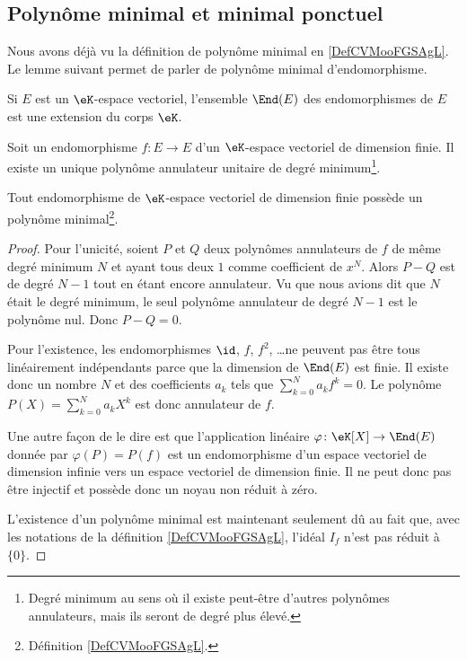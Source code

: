 \subsection{Polynôme minimal et minimal ponctuel}

Nous avons déjà vu la définition de polynôme minimal en \ref{DefCVMooFGSAgL}. Le lemme suivant permet de parler de polynôme minimal d'endomorphisme.

\begin{lemma}       \label{LEMooEYPSooLCoPlY}
	Si \( E\) est un \( \eK\)-espace vectoriel, l'ensemble \( \End(E)\) des endomorphismes de \( E\) est une extension du corps \( \eK\).
\end{lemma}

\begin{lemma}        \label{LEMooQJQGooRcAxmJ}
	Soit un endomorphisme \( f\colon E\to E\) d'un \( \eK\)-espace vectoriel de dimension finie. Il existe un unique polynôme annulateur unitaire de degré minimum\footnote{Degré minimum au sens où il existe peut-être d'autres polynômes annulateurs, mais ils seront de degré plus élevé.}.

	Tout endomorphisme de \( \eK\)-espace vectoriel de dimension finie possède un polynôme minimal\footnote{Définition \ref{DefCVMooFGSAgL}.}.
\end{lemma}

\begin{proof}
	Pour l'unicité, soient \( P\) et \( Q\) deux polynômes annulateurs de \( f\) de même degré minimum \( N\) et ayant tous deux \( 1\) comme coefficient de \( x^N\). Alors \( P-Q\) est de degré \( N-1\) tout en étant encore annulateur. Vu que nous avions dit que \( N\) était le degré minimum, le seul polynôme annulateur de degré \( N-1\) est le polynôme nul. Donc \( P-Q=0\).

	Pour l'existence, les endomorphismes \( \id\), \( f\), \( f^2\), \ldots ne peuvent pas être tous linéairement indépendants parce que la dimension de \( \End(E)\) est finie. Il existe donc un nombre \( N\) et des coefficients \( a_k\) tels que \( \sum_{k=0}^Na_kf^k=0\). Le polynôme \( P(X)=\sum_{k=0}^Na_kX^k\) est donc annulateur de \( f\).

	Une autre façon de le dire est que l'application linéaire \( \varphi\colon \eK[X]\to \End(E)\) donnée par \( \varphi(P)=P(f)\) est un endomorphisme d'un espace vectoriel de dimension infinie vers un espace vectoriel de dimension finie. Il ne peut donc pas être injectif et possède donc un noyau non réduit à zéro.

	L'existence d'un polynôme minimal est maintenant seulement dû au fait que, avec les notations de la définition \ref{DefCVMooFGSAgL}, l'idéal \( I_f\) n'est pas réduit à \( \{ 0 \}\).
\end{proof}

